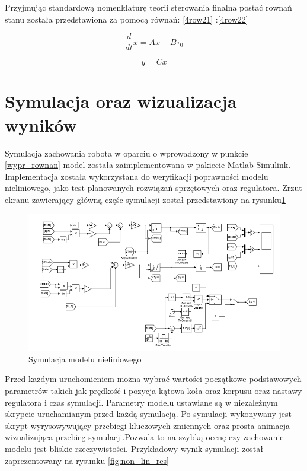 Przyjmując standardową nomenklaturę teorii sterowania finalna postać rownań stanu została przedstawiona za pomocą równań: \ref{4row21} :\ref{4row22} 

\begin{equation}
\label{4row21} 
\frac{d}{dt}
x=Ax+B\tau_0
\end{equation}

\begin{equation}
\label{4row22} 
y=Cx
\end{equation}



\section{Symulacja oraz wizualizacja wyników}

Symulacja zachowania robota w oparciu o wprowadzony w punkcie \ref{wypr_rownan} model została zaimplementowana w pakiecie Matlab Simulink. Implementacja została wykorzystana do weryfikacji poprawności modelu nieliniowego, jako test planowanych rozwiązań sprzętowych oraz regulatora. Zrzut ekranu zawierający główną częśc symulacji został przedstawiony na rysunku\ref{fig:non_lin_sim} 

\begin{figure}[h]
	\centering
	\includegraphics[scale=0.6]{sim_non_lin.PNG}
	\caption{Symulacja modelu nieliniowego}
	\label{fig:non_lin_sim}
\end{figure}

Przed każdym uruchomieniem można wybrać wartości początkowe podstawowych parametrów takich jak prędkość i pozycja kątowa koła oraz korpusu oraz nastawy regulatora i czas symulacji.
Parametry modelu ustawiane są w niezależnym skrypcie uruchamianym przed każdą symulacją. Po symulacji wykonywany jest skrypt wyrysowywujący przebiegi kluczowych zmiennych oraz prosta animacja wizualizująca przebieg symulacji.Pozwala to na szybką ocenę czy zachowanie modelu jest bliskie rzeczywistości. Przykładowy wynik symulacji został zaprezentowany na rysunku \ref{fig:non_lin_res} 

